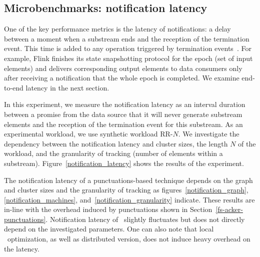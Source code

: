 \subsection{Microbenchmarks: notification latency}
\label{absolute-latency}

One of the key performance metrics is the latency of notifications: a delay between a moment when a substream ends and the reception of the termination event. This time is added to any operation triggered by termination events~\cite{Carbone:2017:SMA:3137765.3137777, we2018adbis}. For example, Flink finishes its state snapshotting protocol for the epoch (set of input elements) and delivers corresponding output elements to data consumers only after receiving a notification that the whole epoch is completed. We examine end-to-end latency in the next section.



In this experiment, we measure the notification latency as an interval duration between a promise from the data source that it will never generate substream elements and the reception of the termination event for this substream. As an experimental workload, we use synthetic workload RR-$N$. We investigate the dependency between the notification latency and cluster sizes, the length $N$ of the workload, and the granularity of tracking (number of elements within a substream). Figure~\ref{notification_latency} shows the results of the experiment. 

The notification latency of a punctuations-based technique depends on the graph and cluster sizes and the granularity of tracking as figures~\ref{notification_graph},\ref{notification_machines}, and~\ref{notification_granularity} indicate. These results are in-line with the overhead induced by punctuations shown in Section~\ref{fs-acker-punctuations}. Notification latency of \tracker\ slightly fluctuates but does not directly depend on the investigated parameters. One can also note that local \tracker\ optimization, as well as distributed version, does not induce heavy overhead on the latency.

